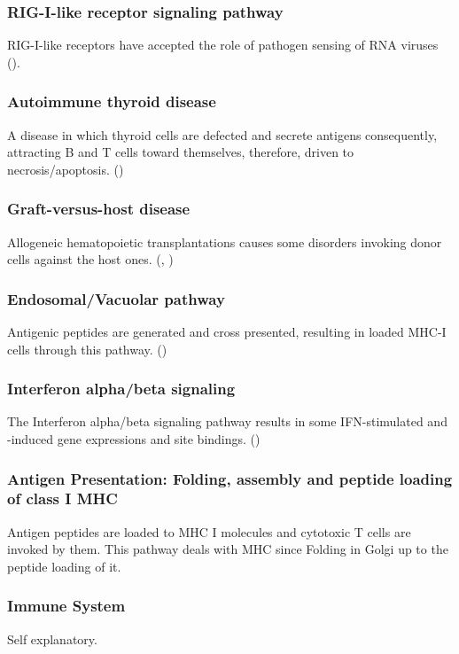 \documentclass[3p,authoryear,preprint,12pt]{elsarticle}
\begin{document}
\subsubsection{RIG-I-like receptor signaling pathway}
RIG-I-like receptors have accepted the role of pathogen sensing of RNA viruses (\cite{Loo2011}).

\subsubsection{Autoimmune thyroid disease}
A disease in which thyroid cells are defected and secrete antigens consequently, attracting B and T cells toward themselves, therefore, driven to necrosis/apoptosis. (\cite{KEGG ATD})

\subsubsection{Graft-versus-host disease}
Allogeneic hematopoietic transplantations causes some disorders invoking donor cells against the host ones. (\cite{Ferrara2009}, \cite{GvHD})

\subsubsection{Endosomal/Vacuolar pathway}
Antigenic peptides are generated and cross presented, resulting in loaded MHC-I cells through this pathway. (\cite{Reactome E/V P})

\subsubsection{Interferon alpha/beta signaling}
The Interferon alpha/beta signaling pathway results in some IFN-stimulated and -induced gene expressions and site bindings.
(\cite{Reactome INFA/B sig})

\subsubsection{Antigen Presentation: Folding, assembly and peptide loading of class I MHC}
Antigen peptides are loaded to MHC I molecules and cytotoxic T cells are invoked by them. This pathway deals with MHC since Folding in Golgi up to the peptide loading of it.

\subsubsection{Immune System}
Self explanatory.
\end{document}
